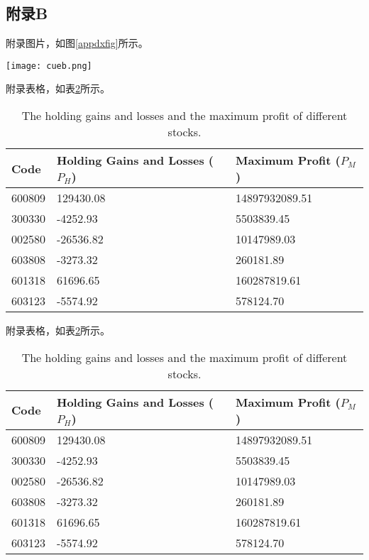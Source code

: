 \begin{appendix}
\chapter*{附录B}
\renewcommand{\thetable}{B.\arabic{table}}
\renewcommand{\thefigure}{B.\arabic{figure}}

附录图片，如图\ref{appdxfig}所示。
\begin{figure*}[htb]
\centering
\texttt{[image: cueb.png]}
\caption{插图样例}
\label{appdxfig}
\end{figure*}

附录表格，如表\ref{appdxtab}所示。
\begin{table}[htp]
\small
\centering
\setlength{\abovecaptionskip}{12pt}
\setlength{\belowcaptionskip}{6pt}
\caption{The holding gains and losses and the maximum profit of different stocks.}
\begin{tabular}{p{3cm}p{5cm}p{5cm}}\toprule[1.5pt]
Code& Holding Gains and Losses ($P_{H}$)& Maximum Profit ($P_{M}$)\\\midrule[1pt]
600809& 129430.08 & 14897932089.51 \\
300330& -4252.93 & 5503839.45 \\
002580& -26536.82 & 10147989.03 \\
603808& -3273.32 & 260181.89 \\
601318& 61696.65 & 160287819.61 \\
603123& -5574.92 & 578124.70\\
\bottomrule[1.5pt]
\end{tabular}
\label{appdxtab}
\end{table}

附录表格，如表\ref{appdxtab}所示。
\begin{table}[htp]
\small
\centering
\setlength{\abovecaptionskip}{12pt}
\setlength{\belowcaptionskip}{6pt}
\caption{The holding gains and losses and the maximum profit of different stocks.}
\begin{tabular}{p{3cm}p{5cm}p{5cm}}\toprule[1.5pt]
Code& Holding Gains and Losses ($P_{H}$)& Maximum Profit ($P_{M}$)\\\midrule[1pt]
600809& 129430.08 & 14897932089.51 \\
300330& -4252.93 & 5503839.45 \\
002580& -26536.82 & 10147989.03 \\
603808& -3273.32 & 260181.89 \\
601318& 61696.65 & 160287819.61 \\
603123& -5574.92 & 578124.70\\
\bottomrule[1.5pt]
\end{tabular}
\label{appdxtab}
\end{table}


\end{appendix}
